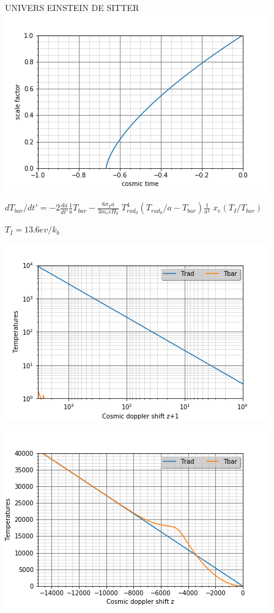 \documentclass[12pt, a4paper]{article}
\begin{document}
\newpage
UNIVERS EINSTEIN DE SITTER
\\
\includegraphics{EinsteinDeSitter}

\newpage
\bigskip

$dT_{bar}/dt' = -2 \frac{da}{dt'}\frac{1}{a} T_{bar}-\frac{8\sigma_Ta}{3m_ecH_0}\; T_{rad_0}^4 (T_{rad_0}/a-T_{bar})\frac{1}{a^4} \; x_e(T_I/T_{bar})$

\medskip

$T_I = 13.6ev/k_b$


\includegraphics{Temperatures}

\newpage
\includegraphics{TemperaturesL}
\end{document}
